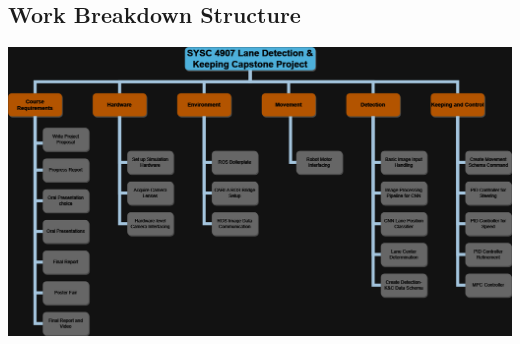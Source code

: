 \documentclass[titlepage]{article}
\begin{document}
\subsection{Work Breakdown Structure}
\includegraphics[width=10in,scale=1, angle=90, origin=c]{wbs.png}
\end{document}
